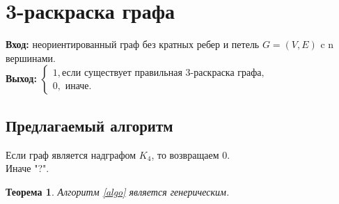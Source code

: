 \documentclass[a4paper, 12pt]{article}
\newtheorem*{theorem}{Теорема}
\theoremstyle{definition}
\theoremstyle{remark}
\begin{document}
\section*{3-раскраска графа}
\textbf{Вход:} неориентированный граф без кратных ребер и петель $G = (V, E)$ c n вершинами.
\\
\textbf{Выход:} $\begin{cases}
    1,\text{если существует правильная 3-раскраска графа,}\\
    0,\text{ иначе.}
\end{cases}$
\subsection*{Предлагаемый алгоритм} \label{algo}
Если граф является надграфом $K_4$, то возвращаем 0. \\
Иначе "?".
\begin{theorem}
    Алгоритм \ref{algo} является генерическим.
\end{theorem}
\end{document}
